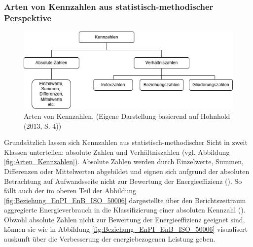 \subsubsection{Arten von Kennzahlen aus statistisch-methodischer Perspektive}

\begin{figure}[H]
    \centering
    \includegraphics[width=1\textwidth]{../../Ressourcen/Abbildungen/Arten_von_Kennzahlen.jpg}
    \caption{Arten von Kennzahlen. (Eigene Darstellung basierend auf Hohnhold (2013, S. 4))}
    \label{fig:Arten_Kennzahlen}
\end{figure}

Grundsätzlich lassen sich Kennzahlen aus statistisch-methodischer Sicht in zweit Klassen unterteilen: absolute Zahlen und Verhältniszahlen (vgl. Abbildung \eqref{fig:Arten_Kennzahlen}).
Absolute Zahlen werden durch Einzelwerte, Summen, Differenzen oder Mittelwerten abgebildet und eignen sich aufgrund der absoluten Betrachtung auf Aufwandsseite nicht zur Bewertung der Energieeffizienz (\cite[S. 2]{Hohnhold.2013}).
So fällt auch der im oberen Teil der Abbildung \eqref{fig:Beziehung_EnPI_EnB_ISO_50006} dargestellte über den Berichtszeitraum aggregierte Energieverbrauch 
in die Klassifizierung einer absoluten Kennzahl (\cite[S. 2]{Hohnhold.2013}).
Obwohl absolute Zahlen nicht zur Bewertung der Energieeffizienz geeignet sind, können sie wie in Abbildung \eqref{fig:Beziehung_EnPI_EnB_ISO_50006} visualisert 
auskunft über die Verbesserung der energiebezogenen Leistung geben.

